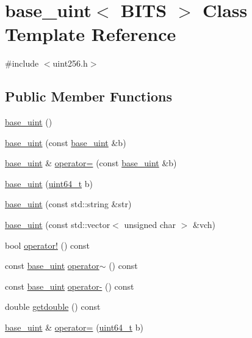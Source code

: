 \hypertarget{classbase__uint}{}\section{base\+\_\+uint$<$ B\+I\+T\+S $>$ Class Template Reference}
\label{classbase__uint}


{\ttfamily \#include $<$uint256.\+h$>$}

\subsection*{Public Member Functions}
\begin{DoxyCompactItemize}
\item 
\hyperlink{classbase__uint_aafd4418923a92b58a1c360e657fa7d83}{base\+\_\+uint} ()
\item 
\hyperlink{classbase__uint_a5d4e4c28c82c3a12b3689860081579c1}{base\+\_\+uint} (const \hyperlink{classbase__uint}{base\+\_\+uint} \&b)
\item 
\hyperlink{classbase__uint}{base\+\_\+uint} \& \hyperlink{classbase__uint_a0425a3c4d342b6fc9a68b1766cee9ede}{operator=} (const \hyperlink{classbase__uint}{base\+\_\+uint} \&b)
\item 
\hyperlink{classbase__uint_a217f9750f0ca9cdeefffb7bb1f1952d6}{base\+\_\+uint} (\hyperlink{stdint_8h_aaa5d1cd013383c889537491c3cfd9aad}{uint64\+\_\+t} b)
\item 
\hyperlink{classbase__uint_aa1ebaba47302da3e120879d186355736}{base\+\_\+uint} (const std\+::string \&str)
\item 
\hyperlink{classbase__uint_ab6dd7d7921572078a4733e4acc22b2a9}{base\+\_\+uint} (const std\+::vector$<$ unsigned char $>$ \&vch)
\item 
bool \hyperlink{classbase__uint_a0f528438872245b8fc54ff60bbb6118a}{operator!} () const 
\item 
const \hyperlink{classbase__uint}{base\+\_\+uint} \hyperlink{classbase__uint_ad64a83e128fcf2d2ac072811a3e36300}{operator$\sim$} () const 
\item 
const \hyperlink{classbase__uint}{base\+\_\+uint} \hyperlink{classbase__uint_a29b620fba192a191054b35bf269ea221}{operator-\/} () const 
\item 
double \hyperlink{classbase__uint_aa701be5115bacf02c299b05598cf616d}{getdouble} () const 
\item 
\hyperlink{classbase__uint}{base\+\_\+uint} \& \hyperlink{classbase__uint_a115a5ddb2f2637e09703a25cfc580483}{operator=} (\hyperlink{stdint_8h_aaa5d1cd013383c889537491c3cfd9aad}{uint64\+\_\+t} b)

\end{DoxyCompactItemize}
